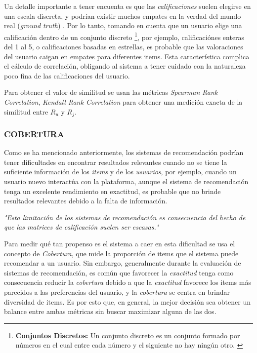 \begin{itemize}
\begin{itemize}[label=$\diamond$]
            Un detalle importante a tener encuenta es que las \textit{calificaciones} suelen elegirse en una escala discreta, y podrían existir muchos empates en la verdad del mundo real (\textit{ground truth}) \parencite{Aggarwal2016}.
            Por lo tanto, tomando en cuenta que un usuario elige una calificación dentro de un conjunto discreto \footnote{\textbf{Conjuntos Discretos: } Un conjunto discreto es un conjunto formado por números en el cual entre cada número y el siguiente no hay ningún otro. \parencite{Perez_MAT_2021}}, por ejemplo, calificaciónes enteras del 1 al 5, o calificaciones basadas en estrellas, es probable que las valoraciones del usuario caigan en empates para diferentes items.
            Esta característica complica el cálculo de correlación, obligando al sistema a tener cuidado con la naturaleza poco fina de las calificaciones del usuario.
            
            Para obtener el valor de similitud se usan las  métricas \textit{Spearman Rank Correlation}, \textit{Kendall Rank Correlation} para obtener una medición exacta de la similitud entre $R_u$ y $R_j$. 
        \end{itemize}         
    \end{itemize}
    
    \newpage
    
    \subsubsection{COBERTURA}

    Como se ha mencionado anteriormente, los sistemas de recomendación podrían tener dificultades en encontrar resultados relevantes cuando no se tiene la suficiente información de los \textit{items} y de los \textit{usuarios}, por ejemplo, cuando un usuario nuevo interactúa con la plataforma, aunque el sistema de recomendación tenga un excelente rendimiento en exactitud, es probable que no brinde resultados relevantes debido a la falta de información. 

    \textit{"Esta limitación de los sistemas de recomendación es consecuencia del hecho de que las matrices de calificación suelen ser escasas."} \parencite{Aggarwal2016}

    Para medir qué tan propenso es el sistema a caer en esta dificultad se usa el concepto de \textit{Cobertura}, que mide la proporción de items que el sistema puede recomendar a un usuario.
    Sin embargo, generalmente durante la evaluación de sistemas de recomendación, es común que favorecer la \textit{exactitud} tenga como consecuencia reducir la \textit{cobertura} debido a que la \textit{exactitud} favorece los items más parecidos a las preferencias del usuario, y la \textit{cobertura} se centra en brindar diversidad de items. Es por esto que, en general, la mejor decisión sea obtener un balance entre ambas métricas sin buscar maximizar alguna de las dos.

